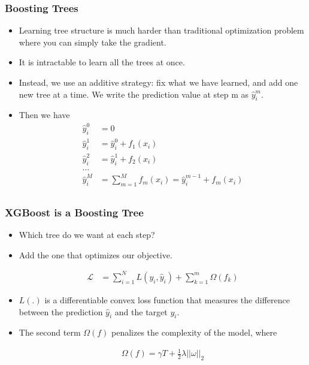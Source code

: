 \documentclass[
  shownotes,
  xcolor={svgnames},
  hyperref={colorlinks,citecolor=DarkBlue,linkcolor=DarkRed,urlcolor=DarkBlue}
  , aspectratio=169]{beamer}
\begin{document}
\begin{frame}[fragile]
\frametitle{Boosting Trees}


\begin{itemize}
\item Learning tree structure is much harder than traditional optimization problem where you can simply take the gradient. 
\item It is intractable to learn all the trees at once. 
\item Instead, we use an additive strategy: fix what we have learned, and add one new tree at a time. We write the prediction value at step m as $\hat{y}_i^{m}$. 
\item Then we have
\begin{align}
\hat{y}_i^{0} &=0 \\ \nonumber
\hat{y}_i^{1} &= \hat{y}_i^{0} + f_1(x_i) \\ \nonumber
\hat{y}_i^{2} &= \hat{y}_i^{1} + f_2(x_i) \\ \nonumber
\dots \\ \nonumber
\hat{y}_i^{M} &= \sum_{m=1}^M f_m(x_i) = \hat{y}_i^{m-1} + f_m(x_i) \\ \nonumber
\end{align}
\end{itemize}


 \end{frame}
\begin{frame}[fragile]
\frametitle{XGBoost is a Boosting Tree }

\begin{itemize}


\item Which tree do we want at each step? 
\item Add the one that optimizes our objective.

\begin{align}
\mathcal{L} &= \sum_{i=1}^N L(y_i,\hat{y}_i) + \sum_{k=1}^m \Omega(f_k)
\end{align}

\item  $L(.)$ is a differentiable convex loss function that measures the difference between the prediction $\hat{y}_i$ and the target $y_i$. 
\item  The second term $\Omega(f)$ penalizes the complexity of the model, where


\begin{align}
\Omega(f)=\gamma T + \frac{1}{2}\lambda ||\omega||_2
\end{align}


\end{itemize}
 \end{frame}
\end{document}
